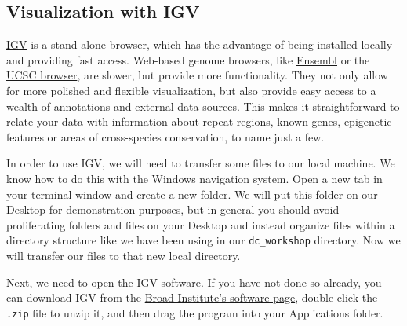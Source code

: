 \documentclass[
  letterpaper,
  DIV=11,
  numbers=noendperiod]{scrreprt}
\begin{document}
\hypertarget{visualization-with-igv}{%
\subsection{Visualization with IGV}\label{visualization-with-igv}}

\href{http://www.broadinstitute.org/igv/}{IGV} is a stand-alone browser,
which has the advantage of being installed locally and providing fast
access. Web-based genome browsers, like
\href{http://www.ensembl.org/index.html}{Ensembl} or the
\href{https://genome.ucsc.edu/}{UCSC browser}, are slower, but provide
more functionality. They not only allow for more polished and flexible
visualization, but also provide easy access to a wealth of annotations
and external data sources. This makes it straightforward to relate your
data with information about repeat regions, known genes, epigenetic
features or areas of cross-species conservation, to name just a few.

In order to use IGV, we will need to transfer some files to our local
machine. We know how to do this with the Windows navigation system. Open
a new tab in your terminal window and create a new folder. We will put
this folder on our Desktop for demonstration purposes, but in general
you should avoid proliferating folders and files on your Desktop and
instead organize files within a directory structure like we have been
using in our \texttt{dc\_workshop} directory. Now we will transfer our
files to that new local directory.

Next, we need to open the IGV software. If you have not done so already,
you can download IGV from the
\href{https://www.broadinstitute.org/software/igv/download}{Broad
Institute's software page}, double-click the \texttt{.zip} file to unzip
it, and then drag the program into your Applications folder.
\end{document}
